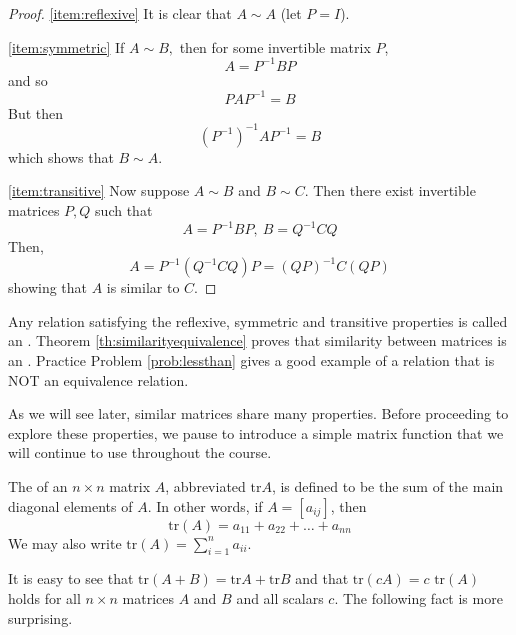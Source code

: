 \documentclass{ximera}
\begin{document}
\begin{proof}
\ref{item:reflexive} It is clear that $A\sim A$ (let $P=I$).
 
\ref{item:symmetric}
If $A\sim B,$ then for some invertible matrix $P$,
\begin{equation*}
A=P^{-1}BP
\end{equation*}
and so
\begin{equation*}
PAP^{-1}=B
\end{equation*}
But then
\begin{equation*}
\left( P^{-1}\right)^{-1}AP^{-1}=B
\end{equation*}
which shows that $B\sim A$.
 
\ref{item:transitive}
Now suppose $A\sim B$ and $B\sim C$. Then there exist invertible matrices
$P,Q$ such that
\begin{equation*}
A=P^{-1}BP,\ B=Q^{-1}CQ
\end{equation*}
Then,
\begin{equation*}
A=P^{-1} \left( Q^{-1}CQ \right)P=\left( QP\right)^{-1}C\left( QP\right)
\end{equation*}
showing that $A$ is similar to $C$.
\end{proof}
 
Any relation satisfying the reflexive, symmetric and transitive properties is called an  .  Theorem \ref{th:similarityequivalence} proves that similarity between matrices is an .  Practice Problem \ref{prob:lessthan} gives a good example of a relation that is NOT an equivalence relation.
 
As we will see later, similar matrices share many properties.
 Before proceeding to explore these properties, we pause to introduce a simple matrix function that we will continue to use throughout the course. 
 
\begin{definition}\label{def:trace}
The  of an $n \times n$ matrix $A$, abbreviated $\mbox{tr} A$, is defined to be the sum of the main diagonal elements of $A$.  In other words, if $ A = [a_{ij}]$, then $$\mbox{tr}(A) = a_{11} + a_{22} + \dots + a_{nn}$$  We may also write $\mbox{tr}(A) =\sum_{i=1}^n a_{ii}$.
\end{definition}
 
It is easy to see that $\mbox{tr}(A + B) = \mbox{tr} A + \mbox{tr} B$ and that $\mbox{tr}(cA) = c \mbox{ tr}(A)$ holds for all $n \times n$ matrices $A$ and $B$ and all scalars $c$. The following fact is more surprising.
 
\end{document}
